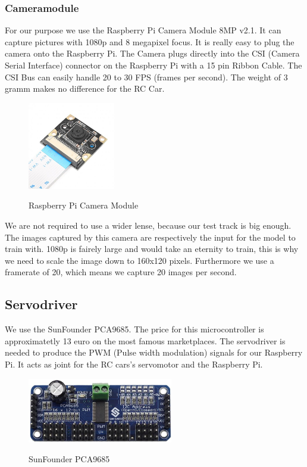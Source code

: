 \documentclass[journal]{IEEEtran}
\begin{document}
\subsubsection{Cameramodule}
\label{sec:cameramodule}

For our purpose we use the Raspberry Pi Camera Module 8MP v2.1. It can capture pictures with 1080p and 8 megapixel focus. 
It is really easy to plug the camera onto the Raspberry Pi. The Camera plugs directly into the CSI (Camera Serial Interface) connector on the Raspberry Pi with a 15 pin Ribbon Cable. The CSI Bus can easily handle 20 to 30 FPS (frames per second). The weight of 3 gramm makes no difference for the RC Car. \\

\begin{figure}
  \begin{center}
  \includegraphics[width=1.5in]{photo/camera.jpg}\\
  \caption{Raspberry Pi Camera Module}\label{camera}
  \end{center}
\end{figure}

We are not required to use a wider lense, because our test track is big enough. The images captured by this camera are respectively the input for the model to train with. 1080p is fairely large and would take an eternity to train, this is why we need to scale the image down to 160x120 pixels. Furthermore we use a framerate of 20, which means we capture 20 images per second.  

\subsection{Servodriver}
We use the SunFounder PCA9685. The price for this microcontroller is approximatetly 13 euro on the most famous marketplaces. The servodriver is needed to produce the PWM (Pulse width modulation) signals for our Raspberry Pi. It acts as joint for the RC cars's servomotor and the Raspberry Pi. \\

\begin{figure}
  \begin{center}
  \includegraphics[width=2.5in]{photo/sunfounder.jpeg}\\
  \caption{SunFounder PCA9685}\label{servodriver}
  \end{center}
\end{figure}
\end{document}

